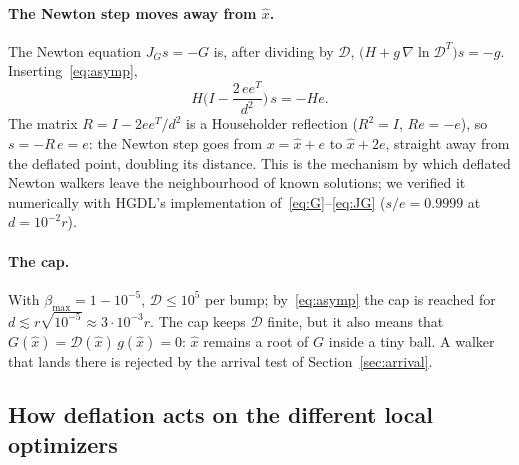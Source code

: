 \documentclass[11pt]{article}
\newcommand{\xh}{\hat{x}}
\begin{document}
\paragraph{The Newton step moves away from $\xh$.}
The Newton equation $J_G s = -G$ is, after dividing by $\mathcal{D}$,
$\big(H + g\, \nabla\ln\mathcal{D}^T\big) s = -g$. Inserting~\eqref{eq:asymp},
\[
  H\Big(I - \frac{2\,e e^T}{d^2}\Big)\, s = -H e .
\]
The matrix $R = I - 2ee^T/d^2$ is a Householder reflection ($R^2 = I$, $Re = -e$), so
$s = -R\,e = e$: the Newton step goes from $x = \xh + e$ to $\xh + 2e$, straight away from the
deflated point, doubling its distance. This is the mechanism by which deflated Newton walkers
leave the neighbourhood of known solutions; we verified it numerically with HGDL's
implementation of~\eqref{eq:G}--\eqref{eq:JG} ($s/e = 0.9999$ at $d = 10^{-2}r$).

\paragraph{The cap.}
With $\beta_{\max} = 1 - 10^{-5}$, $\mathcal{D} \le 10^5$ per bump; by~\eqref{eq:asymp} the cap
is reached for $d \lesssim r\sqrt{10^{-5}} \approx 3\cdot 10^{-3} r$. The cap keeps $\mathcal{D}$
finite, but it also means that $G(\xh) = \mathcal{D}(\xh)\,g(\xh) = 0$: $\xh$ remains a root of
$G$ inside a tiny ball. A walker that lands there is rejected by the arrival test of
Section~\ref{sec:arrival}.

\subsection{How deflation acts on the different local optimizers}\label{sec:defl-methods}
\end{document}
